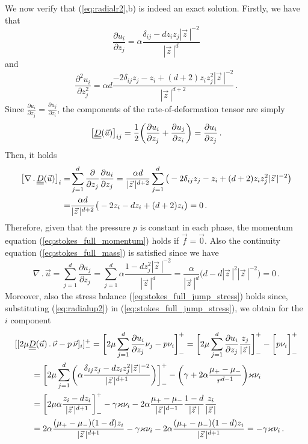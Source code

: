 We now verify that (\ref{eq:radialr2},b) is indeed an exact solution. Firstly,
we have that
\begin{equation*}
\frac{\partial u_i}{\partial z_j}=\alpha\frac{\delta_{ij}
- d z_i z_j |\vec z\,|^{-2}}{|\vec z\,|^d}
\end{equation*}
and
\begin{equation*}
\frac{\partial^2 u_i}{\partial z_j^2}=\alpha d
\frac{-2\delta_{ij}z_j-z_i + (d+2)z_i z_j^2|\vec z\,|^{-2}}{|\vec z\,|^{d+2}}\,.
\end{equation*}
Since $\frac{\partial u_i}{\partial z_j}=\frac{\partial u_j}{\partial z_i}$,
the components of the rate-of-deformation tensor are simply
\begin{equation*}
\big[\mat D(\vec u) \big]_{ij} = \frac{1}{2}\bigg(\frac{\partial
u_i}{\partial z_j} + \frac{\partial u_j}{\partial z_i}\bigg)=\frac{\partial
u_i}{\partial z_j}\,.
\end{equation*}
Then, it holds
\begin{align*}
\big[\nabla\,.\,\mat D(\vec u)\big]_i = &
\sum_{j=1}^d\frac{\partial}{\partial z_j} \frac{\partial u_i}{\partial z_j}
= \frac{\alpha d}{|\vec z\,|^{d+2}}\sum_{j=1}^d\big(-2\delta_{ij}z_j- z_i
+(d+2)z_i z_j^2 |\vec z\,|^{-2}\big)\\
= & \frac{\alpha d}{|\vec z\,|^{d+2}}\big(-2z_i- dz_i+(d+2)z_i\big)=0\,.
\end{align*}
Therefore, given that the pressure $p$ is constant in each phase, the momentum
equation (\ref{eq:stokes_full_momentum}) holds if $\vec f=\vec 0$. Also the
continuity equation (\ref{eq:stokes_full_mass}) is satisfied since we have
\begin{equation*}
\nabla\,.\,\vec u=\sum_{j=1}^d\frac{\partial u_j}{\partial z_j} =
\sum_{j=1}^d\alpha\frac{1 - d z^2_j|\vec z\,|^{-2}}{|\vec z \,|^d} =
\frac{\alpha}{|\vec z\,|^d} \big(d - d |\vec z\,|^2|\vec z\,|^{-2}\big) = 0\,.
\end{equation*}
Moreover, also the stress balance
(\ref{eq:stokes_full_jump_stress}) holds since, substituting
(\ref{eq:radialup2}) in (\ref{eq:stokes_full_jump_stress}), we obtain for the
$i$ component
\begin{align*}
& [[2\mu \mat D(\vec u)\,.\,\vec\nu - p\,\vec \nu]_i]_-^+ =
\bigg[2\mu \sum_{j=1}^d\frac{\partial u_i}{\partial z_j}\nu_j - p\nu_i\bigg]_-^+
= \bigg[2\mu\sum_{j=1}^d\frac{\partial u_i}{\partial z_j}
\frac{z_j}{|\vec z\,|}\bigg]_-^+ -\bigg[ p\nu_i\bigg]_-^+ \\
& \qquad = \bigg[2\mu\sum_{j=1}^d\bigg(\alpha \frac{\delta_{ij}z_j-dz_iz_j^2|
\vec z\,|^{-2}}{|\vec z\,|^{d+1}}\bigg)\bigg]_-^+
-\bigg(\gamma +2 \alpha \frac{\mu_+ - \mu_-}{r^{d-1}}\bigg)\varkappa\nu_i \\
& \qquad = \bigg[2\mu \alpha \frac{z_i-dz_i}{|\vec z\,|^{d+1}}\bigg]_-^+
-\gamma \varkappa \nu_i - 2\alpha\frac{\mu_+ -
\mu_-}{|\vec z\,|^{d-1}}\frac{1-d}{|\vec z\,|}\frac{z_i}{|\vec z\,|} \\
& \qquad = 2\alpha \frac{(\mu_+-\mu_-)(1-d)z_i}{|\vec z\,|^{d+1}}
-\gamma \varkappa \nu_i - 2\alpha\frac{(\mu_+-\mu_-)(1-d)z_i}{|\vec
z\,|^{d+1}} = -\gamma \varkappa \nu_i\,.
\end{align*}
